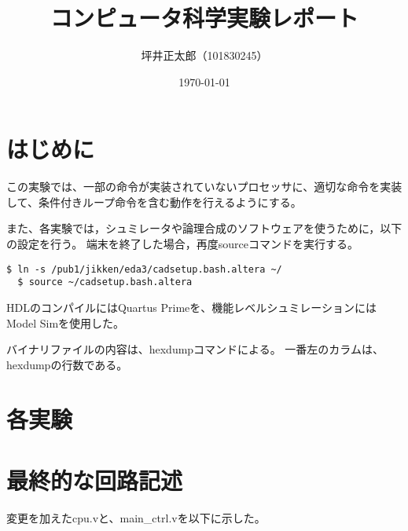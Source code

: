 \documentclass[a4paper,15pt]{jsarticle}
\begin{document}
\title{コンピュータ科学実験レポート}
\author{坪井正太郎（101830245）}
\date{\today}
\maketitle

\section*{はじめに}
この実験では、一部の命令が実装されていないプロセッサに、適切な命令を実装して、条件付きループ命令を含む動作を行えるようにする。

また、各実験では，シュミレータや論理合成のソフトウェアを使うために，以下の設定を行う。
端末を終了した場合，再度sourceコマンドを実行する。
\begin{lstlisting}[caption={設定の読み込み},label={設定の読み込み}]
  $ ln -s /pub1/jikken/eda3/cadsetup.bash.altera ~/
  $ source ~/cadsetup.bash.altera
\end{lstlisting}

HDLのコンパイルにはQuartus Primeを、機能レベルシュミレーションにはModel Simを使用した。

バイナリファイルの内容は、hexdumpコマンドによる。
一番左のカラムは、hexdumpの行数である。

\section*{各実験}








\section{最終的な回路記述}
変更を加えたcpu.vと、main\_ctrl.vを以下に示した。


\end{document}
